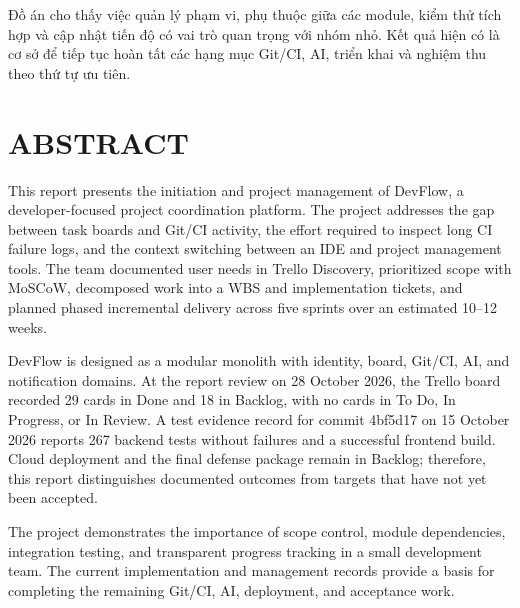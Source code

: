 \documentclass[12pt,a4paper]{report}
\begin{document}
Đồ án cho thấy việc quản lý phạm vi, phụ thuộc giữa các module, kiểm thử tích hợp và cập nhật tiến độ có vai trò quan trọng với nhóm nhỏ. Kết quả hiện có là cơ sở để tiếp tục hoàn tất các hạng mục Git/CI, AI, triển khai và nghiệm thu theo thứ tự ưu tiên.

\chapter*{ABSTRACT}
This report presents the initiation and project management of DevFlow, a developer-focused project coordination platform. The project addresses the gap between task boards and Git/CI activity, the effort required to inspect long CI failure logs, and the context switching between an IDE and project management tools. The team documented user needs in Trello Discovery, prioritized scope with MoSCoW, decomposed work into a WBS and implementation tickets, and planned phased incremental delivery across five sprints over an estimated 10–12 weeks.

DevFlow is designed as a modular monolith with identity, board, Git/CI, AI, and notification domains. At the report review on 28 October 2026, the Trello board recorded 29 cards in Done and 18 in Backlog, with no cards in To Do, In Progress, or In Review. A test evidence record for commit 4bf5d17 on 15 October 2026 reports 267 backend tests without failures and a successful frontend build. Cloud deployment and the final defense package remain in Backlog; therefore, this report distinguishes documented outcomes from targets that have not yet been accepted.

The project demonstrates the importance of scope control, module dependencies, integration testing, and transparent progress tracking in a small development team. The current implementation and management records provide a basis for completing the remaining Git/CI, AI, deployment, and acceptance work.

\tableofcontents
\clearpage
\end{document}
